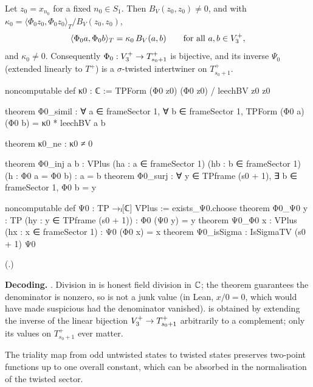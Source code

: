 \begin{theorem}[Similitude]\label{ch14:thm:simil}
Let $z_0=x_{n_0}$ for a fixed $n_0\in S_1$.  Then $B_V(z_0,z_0)\ne0$, and with
$\kappa_0=\langle\Phi_0z_0,\Phi_0z_0\rangle_T/B_V(z_0,z_0)$,
\begin{equation*}
  \langle\Phi_0a,\Phi_0b\rangle_T=\kappa_0\,B_V(a,b)\qquad\text{for all }a,b\in V_3^{+},
\end{equation*}
and $\kappa_0\ne0$.  Consequently $\Phi_0:V_3^{+}\to T_{s_0+1}^+$ is bijective, and its inverse $\Psi_0$ (extended
linearly to $T^+$) is a $\sigma$-twisted intertwiner on $T_{s_0+1}^+$.
\end{theorem}
\begin{leancode}
noncomputable def κ0 : ℂ := TPForm (Φ0 z0) (Φ0 z0) / leechBV z0 z0

theorem Φ0_simil : ∀ a ∈ frameSector 1, ∀ b ∈ frameSector 1,
    TPForm (Φ0 a) (Φ0 b) = κ0 * leechBV a b

theorem κ0_ne : κ0 ≠ 0

theorem Φ0_inj {a b : VPlus} (ha : a ∈ frameSector 1) (hb : b ∈ frameSector 1)
    (h : Φ0 a = Φ0 b) : a = b
theorem Φ0_surj : ∀ y ∈ TPframe (s0 + 1), ∃ b ∈ frameSector 1, Φ0 b = y

noncomputable def Ψ0 : TP →ₗ[ℂ] VPlus := exists_Ψ0.choose
theorem Φ0_Ψ0 {y : TP} (hy : y ∈ TPframe (s0 + 1)) : Φ0 (Ψ0 y) = y
theorem Ψ0_Φ0 {x : VPlus} (hx : x ∈ frameSector 1) : Ψ0 (Φ0 x) = x
theorem Ψ0_isSigma : IsSigmaTV (s0 + 1) Ψ0
\end{leancode}
(.)

\begin{dictionary}
\textbf{Decoding.}  .  Division in  is honest field division in ${\mathbb{C}}$;
the theorem  guarantees the denominator is nonzero, so  is not
a junk value (in Lean, $x/0=0$, which would have made  suspicious had the denominator
vanished).   is obtained by extending the inverse of the linear bijection
$V_3^{+}\to T_{s_0+1}^+$ arbitrarily to a complement; only its values on $T_{s_0+1}^+$ ever matter.
\end{dictionary}
\begin{physics}
The triality map from odd untwisted states to twisted states preserves two-point functions up to one overall constant, which can be absorbed in the normalisation of the twisted sector.
\end{physics}


